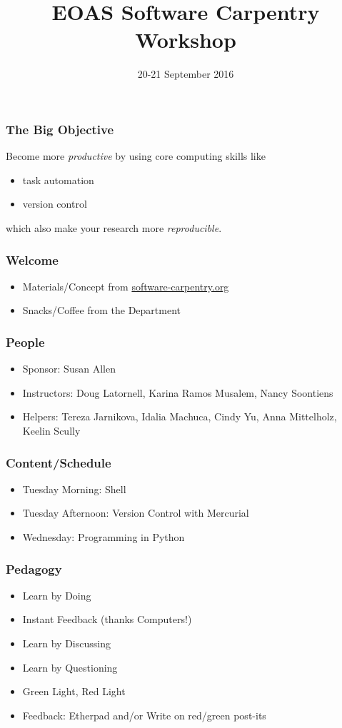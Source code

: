 \documentclass{beamer}
\title[]{EOAS Software Carpentry Workshop}
\subtitle[]{}
\date[]{20-21 September 2016}
\begin{document}




\begin{frame}[plain]
  \titlepage
\end{frame}


\begin{frame}
  \frametitle{The Big Objective}
  Become more {\em productive} by using core computing skills like
  \begin{itemize}
    \item task automation
    \item version control
  \end{itemize}
  which also make your research more {\em reproducible}.
\end{frame}


\begin{frame}
  \frametitle{Welcome}
  \begin{itemize}
    \item Materials/Concept from \href{http://software-carpentry.org/}{software-carpentry.org}
    \item Snacks/Coffee from the Department
  \end{itemize}
\end{frame}


\begin{frame}
  \frametitle{People}
  \begin{itemize}
    \item Sponsor: Susan Allen
    \item Instructors: Doug Latornell, Karina Ramos Musalem, Nancy Soontiens
    \item Helpers: Tereza Jarnikova, Idalia Machuca, Cindy Yu, Anna Mittelholz, Keelin Scully
  \end{itemize}
\end{frame}


\begin{frame}
  \frametitle{Content/Schedule}
  \begin{itemize}
    \item Tuesday Morning: Shell
    \item Tuesday Afternoon: Version Control with Mercurial
    \item Wednesday: Programming in Python
  \end{itemize}
\end{frame}


\begin{frame}
  \frametitle{Pedagogy}
  \begin{itemize}
    \item Learn by Doing
    \item Instant Feedback (thanks Computers!)
    \item Learn by Discussing
    \item Learn by Questioning
    \item Green Light, Red Light
    \item Feedback: Etherpad and/or Write on red/green post-its
  \end{itemize}
\end{frame}
\end{document}
